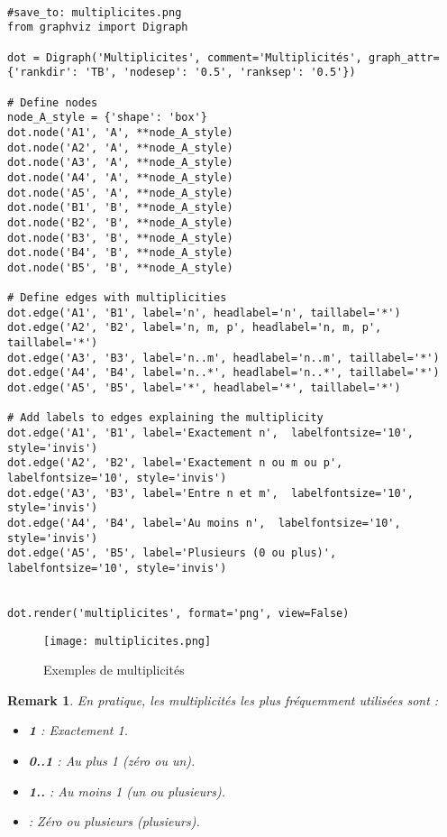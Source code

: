 \documentclass{article}
\newtheorem{remark}{Remark}
\begin{document}
\begin{verbatim}

#save_to: multiplicites.png
from graphviz import Digraph

dot = Digraph('Multiplicites', comment='Multiplicités', graph_attr={'rankdir': 'TB', 'nodesep': '0.5', 'ranksep': '0.5'})

# Define nodes
node_A_style = {'shape': 'box'}
dot.node('A1', 'A', **node_A_style)
dot.node('A2', 'A', **node_A_style)
dot.node('A3', 'A', **node_A_style)
dot.node('A4', 'A', **node_A_style)
dot.node('A5', 'A', **node_A_style)
dot.node('B1', 'B', **node_A_style)
dot.node('B2', 'B', **node_A_style)
dot.node('B3', 'B', **node_A_style)
dot.node('B4', 'B', **node_A_style)
dot.node('B5', 'B', **node_A_style)

# Define edges with multiplicities
dot.edge('A1', 'B1', label='n', headlabel='n', taillabel='*')
dot.edge('A2', 'B2', label='n, m, p', headlabel='n, m, p', taillabel='*')
dot.edge('A3', 'B3', label='n..m', headlabel='n..m', taillabel='*')
dot.edge('A4', 'B4', label='n..*', headlabel='n..*', taillabel='*')
dot.edge('A5', 'B5', label='*', headlabel='*', taillabel='*')

# Add labels to edges explaining the multiplicity
dot.edge('A1', 'B1', label='Exactement n',  labelfontsize='10', style='invis')
dot.edge('A2', 'B2', label='Exactement n ou m ou p',  labelfontsize='10', style='invis')
dot.edge('A3', 'B3', label='Entre n et m',  labelfontsize='10', style='invis')
dot.edge('A4', 'B4', label='Au moins n',  labelfontsize='10', style='invis')
dot.edge('A5', 'B5', label='Plusieurs (0 ou plus)',  labelfontsize='10', style='invis')


dot.render('multiplicites', format='png', view=False)
\end{verbatim}

\begin{figure}[h]
    \centering
    \texttt{[image: multiplicites.png]}
    \caption{Exemples de multiplicités}
    \label{fig:multiplicites}
\end{figure}

\begin{remark}
En pratique, les multiplicités les plus fréquemment utilisées sont :

\begin{itemize}
    \item \textbf{1} : Exactement 1.
    \item \textbf{0..1} : Au plus 1 (zéro ou un).
    \item \textbf{1..\*} : Au moins 1 (un ou plusieurs).
    \item \textbf{\*} : Zéro ou plusieurs (plusieurs).
\end{itemize}
\end{remark}
\end{document}

